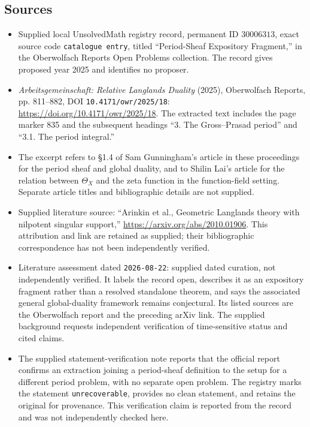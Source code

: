 \documentclass[11pt]{article}
\begin{document}
\subsection{Sources}
\begin{itemize}
\item Supplied local UnsolvedMath registry record, permanent ID \(30006313\), exact source code \texttt{catalogue entry}, titled ``Period-Sheaf Expository Fragment,'' in the Oberwolfach Reports Open Problems collection. The record gives proposed year 2025 and identifies no proposer.
\item \emph{Arbeitsgemeinschaft: Relative Langlands Duality} (2025), Oberwolfach Reports, pp. 811--882, DOI \texttt{10.4171/owr/2025/18}: \url{https://doi.org/10.4171/owr/2025/18}. The extracted text includes the page marker 835 and the subsequent headings ``3. The Gross--Prasad period'' and ``3.1. The period integral.''
\item The excerpt refers to \S 1.4 of Sam Gunningham's article in these proceedings for the period sheaf and global duality, and to Shilin Lai's article for the relation between \(\Theta_X\) and the zeta function in the function-field setting. Separate article titles and bibliographic details are not supplied.
\item Supplied literature source: ``Arinkin et al., Geometric Langlands theory with nilpotent singular support,'' \url{https://arxiv.org/abs/2010.01906}. This attribution and link are retained as supplied; their bibliographic correspondence has not been independently verified.
\item Literature assessment dated \texttt{2026-08-22}: supplied dated curation, not independently verified. It labels the record open, describes it as an expository fragment rather than a resolved standalone theorem, and says the associated general global-duality framework remains conjectural. Its listed sources are the Oberwolfach report and the preceding arXiv link. The supplied background requests independent verification of time-sensitive status and cited claims.
\item The supplied statement-verification note reports that the official report confirms an extraction joining a period-sheaf definition to the setup for a different period problem, with no separate open problem. The registry marks the statement \texttt{unrecoverable}, provides no clean statement, and retains the original for provenance. This verification claim is reported from the record and was not independently checked here.
\end{itemize}
\end{document}
